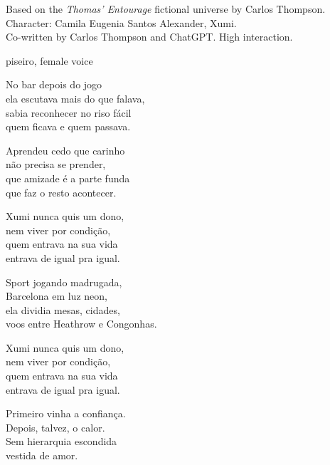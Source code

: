 
\label{sec:de-igual-pra-igual}

\begin{notes}
Based on the \emph{Thomas’ Entourage} fictional universe by Carlos Thompson.\\
Character: Camila Eugenia Santos Alexander, Xumi.\\
Co-written by Carlos Thompson and ChatGPT. %
High interaction.
\end{notes}

\begin{style}
piseiro, female voice
\end{style}

\begin{lyrics}

No bar depois do jogo\\
ela escutava mais do que falava,\\
sabia reconhecer no riso fácil\\
quem ficava e quem passava.

Aprendeu cedo que carinho\\
não precisa se prender,\\
que amizade é a parte funda\\
que faz o resto acontecer.

Xumi nunca quis um dono,\\
nem viver por condição,\\
quem entrava na sua vida\\
entrava de igual pra igual.

Sport jogando madrugada,\\
Barcelona em luz neon,\\
ela dividia mesas, cidades,\\
voos entre Heathrow e Congonhas.

Xumi nunca quis um dono,\\
nem viver por condição,\\
quem entrava na sua vida\\
entrava de igual pra igual.

Primeiro vinha a confiança.\\
Depois, talvez, o calor.\\
Sem hierarquia escondida\\
vestida de amor.


\end{lyrics}
